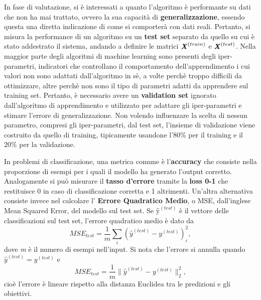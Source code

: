 \documentclass[12pt,a4paper]{report}
\begin{document}
    \medskip
    In fase di valutazione, si \`e interessati a quanto l'algoritmo
    \`e performante su dati che non ha mai trattato, ovvero
    la sua capacit\`a di \textbf{generalizzazione}, essendo questa 
    una diretta indicazione di come si comporter\`a con dati reali. 
    Pertanto, si misura la performance di un algoritmo su un 
    \textbf{test set} separato da quello su cui \`e stato addestrato il 
    sistema, andando a definire le matrici $\textbf{\textit{X}}^{(train)}$
    e $\textbf{\textit{X}}^{(test)}$. Nella maggior parte degli
    algoritmi di machine learning sono presenti degli iper-parametri,
    indicatori che controllano il comportamento dell'apprendimento i
    cui valori non sono adattati dall'algoritmo in s\`e, a volte 
    perch\`e troppo difficili da ottimizzare, altre perch\`e non sono il
    tipo di parametri adatti da apprendere sul training set. Pertanto,
    \`e necessario avere un \textbf{validation set} ignorato 
    dall'algoritmo di apprendimento e utilizzato per adattare gli 
    iper-parametri e stimare l'errore di generalizzazione. Non volendo 
    influenzare la scelta di nessun parametro, compresi gli 
    iper-parametri, dal test set, l'insieme di validazione viene 
    costruito da quello di training, tipicamente usandone l'80\% per il
    training e il 20\% per la validazione.
    
    \medskip
    In problemi di classificazione, una metrica comune \`e
    l'\textbf{accuracy} che consiste nella proporzione di esempi per i
    quali il modello ha generato l'output corretto. Analogamente si
    pu\`o misurare il \textbf{tasso d'errore} tramite la \textbf{loss 
    0-1} che restituisce 0 in caso di classificazione corretta e 1 
    altrimenti. Un'altra alternativa consiste invece nel calcolare l'
    \textbf{Errore Quadratico Medio}, o MSE, dall'inglese Mean Squared 
    Error, del modello sul test set. Se $\textbf{\^y}^{(test)}$ \`e il 
    vettore delle classificazioni sul test set, l'errore quadratico 
    medio \`e dato da
    \begin{equation}
      MSE_{test}=\frac{1}{m}\sum_{i}{(\hat{y}^{(test)}-y^{(test)})}^2_i,
    \end{equation}
    dove \textit{m} \`e il numero di esempi nell'input. Si nota che
    l'errore si annulla quando $\hat{y}^{(test)}=y^{(test)}$ e
    \begin{equation}
      MSE_{test}=\frac{1}{m} \| \hat{y}^{(test)}-y^{(test)} \|^2_2,
    \end{equation}
    cio\`e l'errore \`e lineare rispetto alla distanza Euclidea tra le 
    predizioni e gli obiettivi.
    
\end{document}
